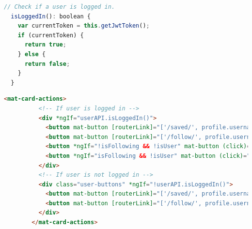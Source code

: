 \begin{lstlisting}[language=JAVASCRIPT,caption={Validate JWT},captionpos=b,label={fig:profileJWT}]
  // Check if a user is logged in.
  isLoggedIn(): boolean {
    var currentToken = this.getJwtToken();
    if (currentToken) {
      return true;
    } else {
      return false;
    }
  }
  \end{lstlisting}
\begin{lstlisting}[language=HTML,caption={Follow / Unfollow option},captionpos=b,label={fig:profilefollow}]
       <mat-card-actions>
          <!-- If user is logged in -->
          <div *ngIf="userAPI.isLoggedIn()">
            <button mat-button [routerLink]="['/saved/', profile.username]">SUBSCRIBED POSTS</button>
            <button mat-button [routerLink]="['/follow/', profile.username]">FRIENDS</button>
            <button *ngIf="!isFollowing && !isUser" mat-button (click)="follow(profile._id)">FOLLOW</button>
            <button *ngIf="isFollowing && !isUser" mat-button (click)="unFollow(profile._id)">UNFOLLOW</button>
          </div>
          <!-- If user is not logged in -->
          <div class="user-buttons" *ngIf="!userAPI.isLoggedIn()">
            <button mat-button [routerLink]="['/saved/', profile.username]">SUBSCRIBED POSTS</button>
            <button mat-button [routerLink]="['/follow/', profile.username]">FOLLOW STUFF</button>
          </div>
        </mat-card-actions>
\end{lstlisting}

